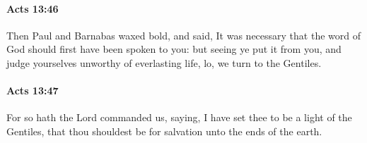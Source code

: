 		\paragraph{Acts 13:46} %
			\label{ACTS-13-46}

			Then Paul and Barnabas waxed bold, and said, It was necessary that the word of God should first have been spoken to you: but seeing ye put it from you, and judge yourselves unworthy of everlasting life, lo, we turn to the Gentiles.

			\begin{framed}
			\scriptsize
				\begin{compactdesc}
					\item[SBLG] 
				\end{compactdesc}
			\end{framed}

		\paragraph{Acts 13:47} %
			\label{ACTS-13-47}

			For so hath the Lord commanded us, saying, I have set thee to be a light of the Gentiles, that thou shouldest be for salvation unto the ends of the earth.


